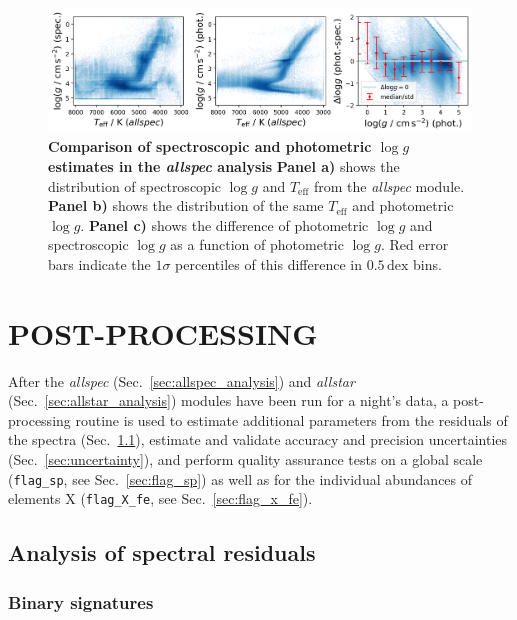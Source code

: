 \documentclass[
  journal=pasa,
  manuscript=research-paper, %
  year=2023,
  volume=37
]{cup-journal}
\newcommand{\Teff}{$T_\mathrm{eff}$\xspace}
\newcommand{\logg}{$\log g$\xspace}
\begin{document}
\begin{figure}[ht]
\centering
\includegraphics[width=\textwidth]{figures/dlogg_spec_plx.png}
\caption{\textbf{Comparison of spectroscopic and photometric \logg estimates in the \textit{allspec} analysis}
\textbf{Panel a)} shows the distribution of spectroscopic \logg and \Teff from the \textit{allspec} module.
\textbf{Panel b)} shows the distribution of the same \Teff and photometric \logg.
\textbf{Panel c)} shows the difference of photometric \logg and spectroscopic \logg as a function of photometric \logg. Red error bars indicate the $1\sigma$ percentiles of this difference in $0.5\,\mathrm{dex}$ bins.} \label{fig:dlogg_spec_plx}
\end{figure}


\section{POST-PROCESSING}
\label{sec:post_processing}

After the \textit{allspec} (Sec.~\ref{sec:allspec_analysis}) and  \textit{allstar} (Sec.~\ref{sec:allstar_analysis}) modules have been run for a night's data, a post-processing routine is used to estimate additional parameters from the residuals of the spectra (Sec.~\ref{sec:residual_analysis}), estimate and validate accuracy and precision uncertainties (Sec.~\ref{sec:uncertainty}), and perform quality assurance tests on a global scale (\texttt{flag\_sp}, see Sec.~\ref{sec:flag_sp}) as well as for the individual abundances of elements X (\texttt{flag\_X\_fe}, see Sec.~\ref{sec:flag_x_fe}).

\subsection{Analysis of spectral residuals} \label{sec:residual_analysis}

\subsubsection{Binary signatures} \label{sec:trigger_binary_module}
\end{document}
